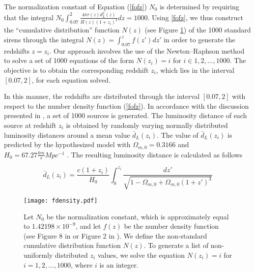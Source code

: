 \documentclass[universe,article,accept,moreauthors,pdftex]{Definitions/mdpi}
\begin{document}
  
The normalization  constant of Equation (\ref{fofz})  $N_{0}$ is determined by requiring that the integral $N_{0} \int^{2}_{0.07} \frac{4 \pi r(z) d_{L}^{2}(z)}{H(z)(1+z_{i})^{3}} dz=1000$. Using \eqref{fofz}, we thus construct the ``cumulative distribution'' function $N(z)$ (see Figure \ref{z1}) of the 1000 standard sirens through the integral $N(z)=\int^{z}_{0.07}f(z')dz'$ in order to generate the redshifts $z=z_{i}$.  Our approach involves the use of the Newton--Raphson method to solve a set of 1000 equations of the form $N(z_{i})=i$ for $i \in {1, 2, \dots, 1000}$. The objective is to obtain the corresponding redshift $z_{i}$, which lies in the interval $[0.07,2]$, for each equation solved.

In this manner, the redshifts are distributed through the interval $[0.07,2 ]$ with respect to the number density function (\ref{fofz}). In accordance with the discussion presented in \cite{Belgacem_2018}, a set of 1000 sources is generated. The luminosity distance of each source at redshift $z_i$ is obtained by randomly varying normally distributed luminosity distances around a mean value $\bar{d}_{L}(z_{i})$. The value of $\bar{d}_{L}(z_{i})$ is predicted by the hypothesized \plcdm model with $\Omega_{m,0}=0.3166$ and $H_{0}=67.27 \frac{km}{s}Mpc^{-1}$ \cite{Planck:2018vyg}. The resulting luminosity distance is calculated as follows

\begin{equation} 
    \bar{d}_{L}(z_{i})=\frac{c(1+z_{i})}{H_{0}}\int_{0}^{z_{i}}\frac{dz'}{\sqrt{1-\Omega_{m,0}+\Omega_{m,0}(1+z')^{3}}}
\end{equation}

 \begin{figure}[H] 
    \texttt{[image: fdensity.pdf]}
    \caption{Let $N_0$ be the normalization constant, which is approximately equal to $1.42198 \times 10^{-9}$, and let $f(z)$ be the number density function (see {Figure 8} in \cite{Belgacem_2018} %
 or {Figure 2 } in \cite{Zhao_2011}%
). We define the non-standard cumulative distribution function $N(z)$. To generate a list of non-uniformly distributed $z_i$ values, we solve the equation $N(z_i) = i$ for $i=1,2,\ldots,1000$, where $i$ is an integer.}
    \label{z1}
\end{figure}
\end{document}

